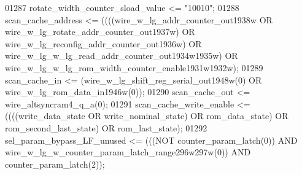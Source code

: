 \begin{DoxyCode}
{01287     \textcolor{vhdlchar}{rotate_width_counter_sload_value} \textcolor{vhdlchar}{<=} \textcolor{vhdllogic}{"10010"};
01288     \textcolor{vhdlchar}{scan_cache_address} \textcolor{vhdlchar}{<=} \textcolor{vhdlchar}{(}\textcolor{vhdlchar}{(}\textcolor{vhdlchar}{(}\textcolor{vhdlchar}{(}\textcolor{vhdlchar}{wire_w_lg_addr_counter_out1938w} \textcolor{keywordflow}{OR} \textcolor{vhdlchar}{
      wire_w_lg_rotate_addr_counter_out1937w}\textcolor{vhdlchar}{)} \textcolor{keywordflow}{OR} \textcolor{vhdlchar}{
      wire_w_lg_reconfig_addr_counter_out1936w}\textcolor{vhdlchar}{)} \textcolor{keywordflow}{OR} \textcolor{vhdlchar}{
      wire_w_lg_w_lg_read_addr_counter_out1934w1935w}\textcolor{vhdlchar}{)} \textcolor{keywordflow}{OR} \textcolor{vhdlchar}{
      wire_w_lg_w_lg_rom_width_counter_enable1931w1932w}\textcolor{vhdlchar}{)};
01289     \textcolor{vhdlchar}{scan_cache_in} \textcolor{vhdlchar}{<=} \textcolor{vhdlchar}{(}\textcolor{vhdlchar}{wire_w_lg_shift_reg_serial_out1948w}\textcolor{vhdlchar}{(}\textcolor{vhdllogic}{}\textcolor{vhdllogic}{0}\textcolor{vhdlchar}{)} \textcolor{keywordflow}{OR} \textcolor{vhdlchar}{
      wire_w_lg_rom_data_in1946w}\textcolor{vhdlchar}{(}\textcolor{vhdllogic}{}\textcolor{vhdllogic}{0}\textcolor{vhdlchar}{)}\textcolor{vhdlchar}{)};
01290     \textcolor{vhdlchar}{scan_cache_out} \textcolor{vhdlchar}{<=} \textcolor{vhdlchar}{wire_altsyncram4_q_a}\textcolor{vhdlchar}{(}\textcolor{vhdllogic}{}\textcolor{vhdllogic}{0}\textcolor{vhdlchar}{)};
01291     \textcolor{vhdlchar}{scan_cache_write_enable} \textcolor{vhdlchar}{<=} \textcolor{vhdlchar}{(}\textcolor{vhdlchar}{(}\textcolor{vhdlchar}{(}\textcolor{vhdlchar}{(}\textcolor{vhdlchar}{write_data_state} \textcolor{keywordflow}{OR} \textcolor{vhdlchar}{write_nominal_state}\textcolor{vhdlchar}{)} \textcolor{keywordflow}{OR} \textcolor{vhdlchar}{
      rom_data_state}\textcolor{vhdlchar}{)} \textcolor{keywordflow}{OR} \textcolor{vhdlchar}{rom_second_last_state}\textcolor{vhdlchar}{)} \textcolor{keywordflow}{OR} \textcolor{vhdlchar}{rom_last_state}\textcolor{vhdlchar}{)};
01292     \textcolor{vhdlchar}{sel_param_bypass_LF_unused} \textcolor{vhdlchar}{<=} \textcolor{vhdlchar}{(}\textcolor{vhdlchar}{(}\textcolor{vhdlchar}{(}\textcolor{keywordflow}{NOT} \textcolor{vhdlchar}{counter_param_latch}\textcolor{vhdlchar}{(}\textcolor{vhdllogic}{}\textcolor{vhdllogic}{0}\textcolor{vhdlchar}{)}\textcolor{vhdlchar}{)} \textcolor{keywordflow}{AND} \textcolor{vhdlchar}{
      wire_w_lg_w_counter_param_latch_range296w297w}\textcolor{vhdlchar}{(}\textcolor{vhdllogic}{}\textcolor{vhdllogic}{0}\textcolor{vhdlchar}{)}\textcolor{vhdlchar}{)} \textcolor{keywordflow}{AND} \textcolor{vhdlchar}{counter_param_latch}\textcolor{vhdlchar}{(}\textcolor{vhdllogic}{}\textcolor{vhdllogic}{2}\textcolor{vhdlchar}{)}\textcolor{vhdlchar}{)};
}
\end{DoxyCode}

